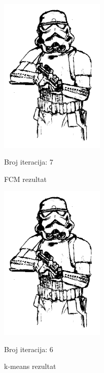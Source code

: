 \documentclass[12pt,a4paper]{article}
\theoremstyle{definition}
\theoremstyle{remark}
\theoremstyle{plain}
\begin{document}
\begin{multicols}{2}
\begin{figure}[H]
\centering
\includegraphics[width=5cm]{images/storm_trooper_binarized_fcm.png}
  \caption{FCM rezultat}\label{storm_trooper_fcm}
 Broj iteracija: 7
\end{figure}
\columnbreak
\begin{figure}[H]
\centering
\includegraphics[width=5cm]{images/storm_trooper_binarized_kmeans.png}
  \caption{k-means rezultat}\label{storm_trooper_kmeans}
 Broj iteracija: 6
\end{figure}
\end{multicols}
\end{document}
